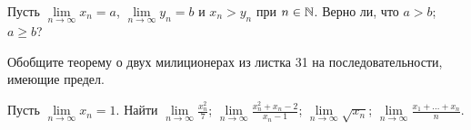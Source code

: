 \documentclass[a4paper,11pt]{article}
\begin{document}
\vspace*{1mm}



Пусть $\lim\limits_{n \to \infty} x_n =a$, $\lim\limits_{n \to
\infty} y_n = b$ и $x_n>y_n$ при $n\in\mathbb{N}$.
Верно ли, что
 $a>b$;
 $a\geq b$?


Обобщите теорему о двух милиционерах из листка 31
на последовательности, имеющие предел.




 Пусть $\lim\limits_{n \to \infty}\! x_n = 1$.
Найти
  $\displaystyle{\lim\limits_{n \to \infty}\!\frac{x_n^2}{7}}$;
  $\displaystyle{\lim\limits_{n \to \infty}\!\frac{x_n^2+x_n-2}{x_n-1}}$;
  $\lim\limits_{n \to \infty}\!\sqrt{x_n}$;
 $\displaystyle{\lim\limits_{n \to \infty}\!\frac{x_1+\ldots+x_n}n}$.



\end{document}

